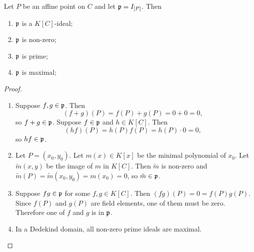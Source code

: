 \begin{proposition}
  \label{prop_I_P_is_prime}
  Let $P$ be an affine point on $C$ and let $\frak p = I_{[P]}$. Then
  \begin{enumerate}[label=(\roman*)]
    \item $\frak p$ is a $K[C]$-ideal;
    \item $\frak p$ is non-zero;
    \item $\frak p$ is prime;
    \item $\frak p$ is maximal;
  \end{enumerate}
\end{proposition}
\begin{proof}
  \begin{enumerate}[label=(\roman*)]
    \item
    Suppose $f, g \in \frak p$. Then
      \[ (f + g)(P) = f(P) + g(P) = 0 + 0 = 0, \]
    so $f + g \in \frak p$.
    Suppose $f \in \frak p$ and $h \in K[C]$. Then
      \[ (hf)(P) = h(P)f(P) = h(P)\cdot 0 = 0, \]
    so $hf \in \frak p$.
    
    \item
    Let $P = (x_0, y_0)$.
    Let $m(x) \in K[x]$ be the minimal polynomial of $x_0$.
    Let $\tilde m(x,y)$ be the image of $m$ in $K[C]$.
    Then $\tilde m$ is non-zero and $\tilde m(P) = \tilde m(x_0, y_0) = m(x_0) = 0$,
    so $\tilde m \in \frak p$.
    
    \item
    Suppose $fg \in \frak p$ for some $f, g \in K[C]$.
    Then $(fg)(P) = 0 = f(P)g(P)$.
    Since $f(P)$ and $g(P)$ are field elements, one of them must be zero.
    Therefore one of $f$ and $g$ is in $\frak p$.
    
    \item
    In a Dedekind domain, all non-zero prime ideals are maximal.\qedhere
    
  \end{enumerate}
\end{proof}

